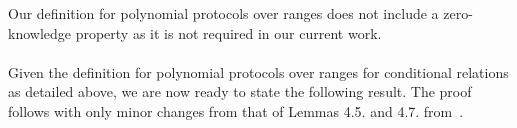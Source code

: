\noindent Our definition for polynomial protocols over ranges does not include a zero-knowledge property as it is not required in our current work. \\

 \\

\noindent Given the definition for polynomial protocols over ranges for conditional relations as detailed above, we are now ready to state the following result.
The proof follows with only minor changes from that of Lemmas 4.5. and 4.7. from~\cite{plonk}. 

